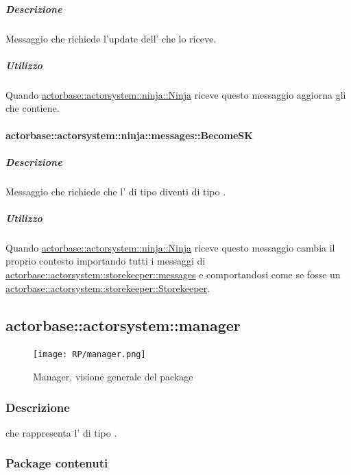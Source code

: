 \documentclass{scalatekids-article}
\begin{document}
\subparagraph{Descrizione}

Messaggio che richiede l'update dell' che lo riceve.

\subparagraph{Utilizzo}

Quando \hyperref[sec:actorbase::actorsystem::ninja::Ninja]{actorbase::actorsystem::ninja::Ninja}
riceve questo messaggio aggiorna gli  che contiene.

\paragraph{actorbase::actorsystem::ninja::messages::BecomeSK}
\label{sec:actorbase::actorsystem::ninja::messages::BecomeSK}

\subparagraph{Descrizione}

Messaggio che richiede che l' di tipo  diventi di tipo
.

\subparagraph{Utilizzo}

Quando \hyperref[sec:actorbase::actorsystem::ninja::Ninja]{actorbase::actorsystem::ninja::Ninja}
riceve questo messaggio cambia il proprio contesto importando tutti i messaggi
di \hyperref[sec:actorbase::actorsystem::storekeeper::messages]{actorbase::\allowbreak{}actorsystem::\allowbreak{}storekeeper::\allowbreak{}messages}
e comportandosi come se fosse un \hyperref[sec:actorbase::actorsystem::storekeeper::Storekeeper]{actorbase::\allowbreak{}actorsystem::\allowbreak{}storekeeper::\allowbreak{}Storekeeper}.

\subsection{actorbase::actorsystem::manager}
\label{sec:actorbase::actorsystem::manager}

\begin{figure}[H]
  \begin{center}
    \texttt{[image: RP/manager.png]}
    \caption{Manager, visione generale del package}
  \end{center}
\end{figure}

\subsubsection{Descrizione}

 che rappresenta l' di tipo .

\subsubsection{Package contenuti}
\end{document}
